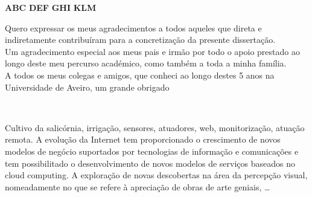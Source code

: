 \documentclass[11pt,twoside,a4paper]{report}
\begin{document}
\TitlePage
  \vspace*{55mm}
       {}
       {\textbf{ABC}}
  \vspace*{5mm}
       {\textbf{DEF}}
  \vspace*{5mm}
  \TEXT{}
       {\textbf{GHI}}
  \vspace*{5mm}
  \TEXT{}
       {\textbf{KLM}}
\EndTitlePage
\titlepage\ \endtitlepage %

\TitlePage
  \vspace*{55mm}
       {
       	Quero expressar os meus agradecimentos a todos aqueles que direta e indiretamente contribuíram para a concretização da presente dissertação.
       	\\ Um agradecimento especial aos meus pais e irmão por todo o apoio prestado ao longo deste meu percurso académico, como também a toda a minha família.\\A todos os meus colegas e amigos, que conheci ao longo destes 5 anos na Universidade de Aveiro, um grande obrigado
       	}
    
\EndTitlePage
\titlepage\ \endtitlepage %

\TitlePage
	\vspace*{55mm}
	{Cultivo da salicórnia, irrigação, sensores, atuadores, web, monitorização, atuação remota.}
  	\vspace*{5mm}
       {A evolução da Internet tem proporcionado o crescimento de novos modelos de negócio suportados por tecnologias de informação e comunicações e tem possibilitado o desenvolvimento de novos modelos de serviços baseados no cloud computing.
       	}
  \TEXT{}
       {A explora\c c\~ao de novas descobertas na \'area da percep\c c\~ao visual, nomeadamente
        no que se refere \`a aprecia\c c\~ao de obras de arte geniais, \ldots}
\EndTitlePage
\titlepage\ \endtitlepage %
\end{document}

